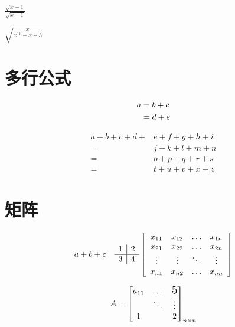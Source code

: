 \documentclass{article}
\begin{document}
    $\frac{\sqrt{x-1}}{\sqrt{x+1}}$

    $\sqrt{\frac{x}{x^{11} - x + 3}}$



\section{多行公式}
    \begin{align} 
    a & = b + c \notag \\ 
    &=d+e 
    \end{align}
    
    \[
    \begin{aligned} 
    a+b+c+d+& e+f+g+h+i \\
    =& j+k+l+m+n \\
    =& o+p+q+r+s \\ 
    =& t+u+v+x+z \end{aligned}
    \]

\section{矩阵}
    \[
    a + b \\ + c\quad %
    \begin{array}{l | l}
    {1} & {2} \\ 
    \hline
    {3} & {4}
    \end{array} 
    \left[\begin{array}{cccc}
    {x_{11}} & {x_{12}} & {\dots} & {x_{1 n}} \\ 
    {x_{21}} & {x_{22}} & {\dots} & {x_{2 n}} \\ 
    {\vdots} & {\vdots} & {\ddots} & {\vdots} \\ 
    {x_{n 1}} & {x_{n 2}} & {\dots} & {x_{n n}}
    \end{array}\right]
    \]

    \[
    A = \begin{bmatrix}
        a_{11} & \dots & \text{\Large5}\\ %
        & \ddots  & \vdots \\ %
        1 &  & 2    
    \end{bmatrix}_{n \times n} %
    \]
\end{document}
